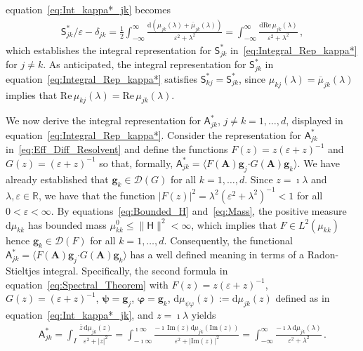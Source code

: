 \documentclass[leqno,onefignum,onetabnum]{siamltex1213}
\renewcommand{\d}{\mathrm{d}}
\newcommand{\Ab}{\mathbf{A}}
\newcommand{\Qb}{\mathbf{Q}}
\newcommand{\Hm}{\mathsf{H}}
\newcommand{\Sm}{\mathsf{S}}
\newcommand{\Am}{\mathsf{A}}
\newcommand{\Ds}{\mathscr{D}}
\providecommand\bcdot{\boldsymbol{\cdot}}
\newcommand{\vecg}{\boldsymbol{g}}
\newcommand{\vecpsi}{\boldsymbol{\psi}}
\newcommand{\vecvarphi}{\boldsymbol{\varphi}}
\begin{document}
equation~\eqref{eq:Int_kappa*_jk} becomes  
% 
\begin{align}\label{eq:Int_kappa*_jk_Re}
  \Sm^*_{jk}/\varepsilon-\delta_{jk}
       =\frac{1}{2}\int_{-\infty}^\infty\frac{\d(\mu_{jk}(\lambda)+\overline{\mu}_{jk}(\lambda))}{\varepsilon^2+\lambda^2}
       =\int_{-\infty}^\infty\frac{\d\text{Re}\,\mu_{jk}(\lambda)}{\varepsilon^2+\lambda^2}\,,            
\end{align}
%
which establishes the integral representation for $\Sm^*_{jk}$
in~\eqref{eq:Integral_Rep_kappa*} for $j\neq k$. As anticipated, the 
integral representation for $\Sm^*_{jk}$ in
equation~\eqref{eq:Integral_Rep_kappa*} satisfies
$\Sm^*_{kj}=\Sm^*_{jk}$, since 
$\mu_{kj}(\lambda)=\overline{\mu}_{jk}(\lambda)$ implies that
$\text{Re}\,\mu_{kj}(\lambda)=\text{Re}\,\mu_{jk}(\lambda)$.





We now derive the integral representation for $\Am^*_{jk}$, $j\neq k=1,\ldots,d$,
displayed in equation~\eqref{eq:Integral_Rep_kappa*}. Consider the
representation for $\Am^*_{jk}$ in~\eqref{eq:Eff_Diff_Resolvent} and
define the functions $F(z)=z(\varepsilon+z)^{-1}$ and $G(z)=(\varepsilon+z)^{-1}$ so that,
formally, $\Am^*_{jk}=\langle F(\Ab)\vecg_j\bcdot G(\Ab)\vecg_k\rangle$. We have
already established that $\vecg_k\in\Ds(G)$ for all
$k=1,\ldots,d$. Since $z=\imath\lambda$ and $\lambda,\varepsilon\in\mathbb{R}$, we have that the
function $|F(z)|^2=\lambda^2(\varepsilon^2+\lambda^2)^{-1}<1$ for all $0<\varepsilon<\infty$.  By
equations~\eqref{eq:Bounded_H} and~\eqref{eq:Mass}, the positive
measure $\d\mu_{kk}$ has bounded mass $\mu^0_{kk}\leq\|\Hm\|^2<\infty$, which implies that
$F\in L^2(\mu_{kk})$ hence $\vecg_k\in\Ds(F)$ for all
$k=1,\ldots,d$. Consequently, the functional $\Am^*_{jk}=\langle F(\Ab)\vecg_j\bcdot
G(\Ab)\vecg_k\rangle$ has a well defined 
meaning in terms of a Radon-Stieltjes integral. Specifically, the
second formula in equation~\eqref{eq:Spectral_Theorem} with
$F(z)=z(\varepsilon+z)^{-1}$, $G(z)=(\varepsilon+z)^{-1}$, $\vecpsi=\vecg_j$,
$\vecvarphi=\vecg_k$, $\d\mu_{\psi\varphi}(z):=\d\mu_{jk}(z)$ defined as in
equation~\eqref{eq:Int_kappa*_jk},  
and $z=\imath\lambda$ yields          
%
\begin{align}\label{eq:Int_alpha*_jk}
  \Am^*_{jk}
     =\int_I\frac{\overline{z}\,\d\mu_{jk}(z)}{\varepsilon^2+|z|^2}
     =\int_{-\imath\infty}^{\imath\infty}\frac{-\imath\,\text{Im}(z)\d\mu_{jk}(\text{Im}(z))}{\varepsilon^2+|\text{Im}(z)|^2}
     =\int_{-\infty}^\infty\frac{-\imath\lambda\,\d\mu_{jk}(\lambda)}{\varepsilon^2+\lambda^2}\,.
\end{align}
%
\end{document}

